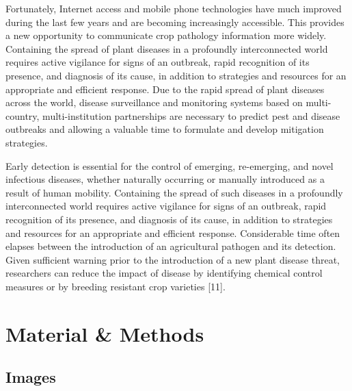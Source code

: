 \documentclass{frontiersSCNS} %
\begin{document}
Fortunately, Internet access and mobile phone technologies have much improved during the last few years and are becoming increasingly accessible. This provides a new opportunity to communicate crop pathology information more widely. Containing the spread of plant diseases in a profoundly interconnected world requires active vigilance for signs of an outbreak, rapid recognition of its presence, and diagnosis of its cause, in addition to strategies and resources for an appropriate and efficient response. Due to the rapid spread of plant diseases across the world, disease surveillance and monitoring systems based on multi-country, multi-institution partnerships are necessary to predict pest and disease outbreaks and allowing a valuable time to formulate and develop mitigation strategies. 

Early detection is essential for the control of emerging, re-emerging, and novel infectious diseases, whether naturally occurring or manually introduced as a result of human mobility. Containing the spread of such diseases in a profoundly interconnected world requires active vigilance for signs of an outbreak, rapid recognition of its presence, and diagnosis of its cause, in addition to strategies and resources for an appropriate and efficient response. Considerable time often elapses between the introduction of an agricultural pathogen and its detection. Given sufficient warning prior to the introduction of a new plant disease threat, researchers can reduce the impact of disease by identifying chemical control measures or by breeding resistant crop varieties [11].  

\section{Material \& Methods}

\subsection{Images}
\end{document}
